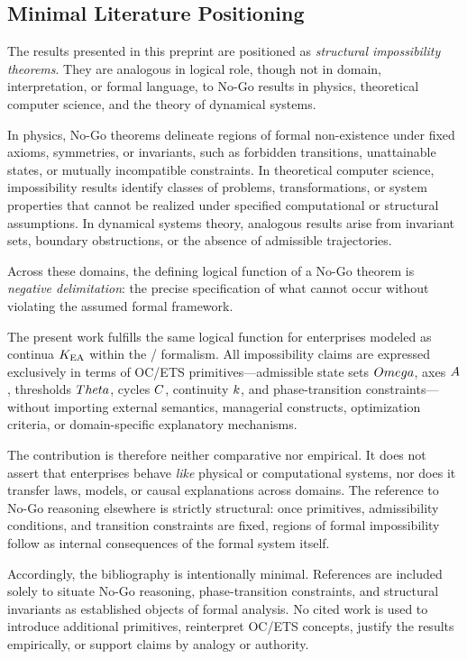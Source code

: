 ﻿%

\subsection*{Minimal Literature Positioning}

The results presented in this preprint are positioned as
\emph{structural impossibility theorems}. They are analogous in logical role,
though not in domain, interpretation, or formal language, to No-Go results in
physics, theoretical computer science, and the theory of dynamical systems.

In physics, No-Go theorems delineate regions of formal non-existence under fixed
axioms, symmetries, or invariants, such as forbidden transitions, unattainable
states, or mutually incompatible constraints. In theoretical computer science,
impossibility results identify classes of problems, transformations, or system
properties that cannot be realized under specified computational or structural
assumptions. In dynamical systems theory, analogous results arise from invariant
sets, boundary obstructions, or the absence of admissible trajectories.

Across these domains, the defining logical function of a No-Go theorem is
\emph{negative delimitation}: the precise specification of what cannot occur
without violating the assumed formal framework.

The present work fulfills the same logical function for enterprises modeled as
continua $K_{\mathrm{EA}}$ within the \OC/ formalism. All impossibility
claims are expressed exclusively in terms of OC/ETS primitives—admissible state
sets $Omega$, axes $A$, thresholds $Theta$, cycles $C$, continuity $k$, and
phase-transition constraints—without importing external semantics, managerial
constructs, optimization criteria, or domain-specific explanatory mechanisms.

The contribution is therefore neither comparative nor empirical. It does not
assert that enterprises behave \emph{like} physical or computational systems,
nor does it transfer laws, models, or causal explanations across domains. The
reference to No-Go reasoning elsewhere is strictly structural: once primitives,
admissibility conditions, and transition constraints are fixed, regions of
formal impossibility follow as internal consequences of the formal system
itself.

Accordingly, the bibliography is intentionally minimal. References are included
solely to situate No-Go reasoning, phase-transition constraints, and structural
invariants as established objects of formal analysis. No cited work is used to
introduce additional primitives, reinterpret OC/ETS concepts, justify the
results empirically, or support claims by analogy or authority.

